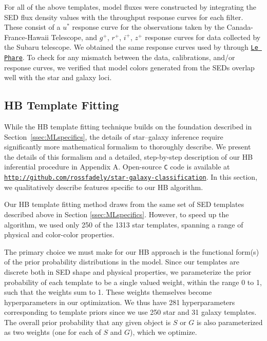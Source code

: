 \documentclass[12pt,preprint]{aastex}
\begin{document}
For all of the above templates, model fluxes were constructed by 
integrating the SED flux density values with the throughput response 
curves for each filter.  These consist of a $u^\ast$ response curve for 
the observations taken by the Canada-France-Hawaii Telescope, and 
$g^+$, $r^+$, $i^+$, $z^+$ response curves for data 
collected by the Subaru telescope.  We obtained the same response 
curves used by \citet{ilbert09} through 
\href{http://www.cfht.hawaii.edu/\%7Earnouts/LEPHARE/lephare.html}
{\texttt{Le Phare}}\footnotemark[5].  To check for any mismatch between 
the data, calibrations, and/or response curves, we verified that model 
colors generated from the SEDs overlap well with the star and galaxy loci.

\subsection{HB Template Fitting}
\label{ssec:HBspecifics}

While the HB template fitting technique builds on the foundation
described in Section~\ref{ssec:MLspecifics}, the details of
star--galaxy inference require significantly more mathematical
formalism to thoroughly describe.  We present the details of this
formalism and a detailed, step-by-step description of our HB
inferential procedure in Appendix A.  Open-source \texttt{C} code is
available at {\footnotesize
  \texttt{\url{http://github.com/rossfadely/star-galaxy-classification}}}.
In this section, we qualitatively describe features specific to our HB
algorithm.


Our HB template fitting method draws from the same set of SED
templates described above in Section \ref{ssec:MLspecifics}.  However,
to speed up the algorithm, we used only 250 of the 1313 star
templates, spanning a range of physical and color-color properties.

The primary choice we must make for our HB approach is the functional
form(s) of the prior probability distributions in the model.  Since
our templates are discrete both in SED shape and physical properties,
we parameterize the prior probability of each template to be a single
valued weight, within the range 0 to 1, such that the weights sum to
1.  These weights themselves become hyperparameters in our
optimization.  We thus have 281 hyperparameters corresponding to
template priors since we use 250 star and 31 galaxy templates.  The
overall prior probability that any given object is $S$ or $G$ is also
parameterized as two weights (one for each of $S$ and $G$), which we
optimize.
\end{document}
